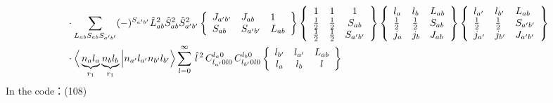 \documentclass[master]{shnuthesis}
\newcommand{\ap}{a^\prime}
\newcommand{\bp}{b^\prime}
\begin{document}
\begin{align}
    & \cdot \sum_{L_{ab}S_{ab}S_{\ap\bp}} (-)^{S_{\ap\bp}} \hat{L}_{ab}^2\hat{S}_{ab}^2\hat{S}_{\ap\bp}^2  \left\{\begin{array}{lll} J_{\ap\bp} & J_{ab} & 1 \\ S_{ab} & S_{\ap\bp} & L_{ab} \end{array}\right\}  \left\{\begin{array}{ccc} 1 & 1 & 1 \\ \frac{1}{2} & \frac{1}{2} & S_{ab} \\ \frac{1}{2} & \frac{1}{2} & S_{\ap\bp} \end{array}\right\}  \left\{\begin{array}{lll}l_{a} & l_{b} & L_{ab} \\ \frac{1}{2} & \frac{1}{2} & S_{ab} \\j_{a} & j_{b} & J_{ab} \end{array}\right\}  \left\{\begin{array}{lll} l_{\ap} & l_{\bp} & L_{ab} \\ \frac{1}{2} & \frac{1}{2} & S_{\ap\bp} \\j_{\ap} & j_{\bp} & J_{\ap\bp} \end{array}\right\}  \notag \\
    & \cdot \Big\langle \underbrace{n_a l_a}_{r_1} \underbrace{n_b l_b}_{r_1} \Big| n_{\ap} l_{\ap} n_{\bp} l_{\bp} \Big\rangle \sum_{l=0}^\infty \,\hat{l}^{\,2}\,C_{l_{\ap} 0 l 0}^{l_a 0} \,C_{l_{\bp} 0 l 0}^{l_b 0}  \left\{\begin{array}{ccc} l_{\bp} & l_{\ap} & L_{ab} \\ l_a & l_b & l \end{array}\right\}
\end{align}
In the code：(108)
\end{document}
